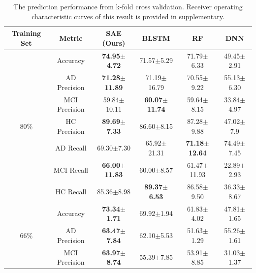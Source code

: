 \begin{table}[ht]
    \centering
    \caption{The prediction performance from k-fold cross validation. Receiver operating characteristic curves of this result is provided in supplementary.}\label{tab: experimetal results}
    \begin{tabular}{c c cccc}
        \toprule
    \multirow{1}{*}{\bfseries Training Set} & {\bfseries Metric} & \multicolumn{1}{c}{{\bfseries SAE} (Ours)} & \multicolumn{1}{c}{{\bfseries BLSTM}} & \multicolumn{1}{c}{{\bfseries RF}} & {\bfseries DNN}         \\
    \midrule
    \multirow{7}{*}{80\%} %
    & Accuracy & \multicolumn{1}{c}{{\bfseries 74.95$\pm$4.72}} & \multicolumn{1}{c}{71.57$\pm$5.29} & \multicolumn{1}{c}{71.79$\pm$6.33} & 49.45$\pm$2.91\\
    & AD Precision & \multicolumn{1}{c}{{\bfseries 71.28$\pm$11.89}} & \multicolumn{1}{c}{71.19$\pm$16.79} & \multicolumn{1}{c}{70.55$\pm$9.22} & 55.13$\pm$6.30\\
    & MCI Precision & \multicolumn{1}{c}{59.84$\pm$10.11} & \multicolumn{1}{c}{{\bfseries 60.07$\pm$11.74}} & \multicolumn{1}{c}{59.64$\pm$8.15} & 33.84$\pm$4.97\\
    & HC Precision & \multicolumn{1}{c}{{\bfseries 89.69$\pm$7.33}} & \multicolumn{1}{c}{86.60$\pm$8.15} & \multicolumn{1}{c}{87.28$\pm$9.88} & 47.02$\pm$7.9\\
    & AD Recall & \multicolumn{1}{c}{69.30$\pm$7.30} & \multicolumn{1}{c}{65.92$\pm$21.31} & \multicolumn{1}{c}{{\bfseries 71.18$\pm$12.64}} & 74.49$\pm$7.45\\
    & MCI Recall & \multicolumn{1}{c}{{\bfseries 66.00$\pm$11.83}} & \multicolumn{1}{c}{60.00$\pm$8.57} & \multicolumn{1}{c}{61.47$\pm$11.93} & 22.89$\pm$2.93\\
    & HC Recall & \multicolumn{1}{c}{85.36$\pm$8.98} & \multicolumn{1}{c}{{\bfseries 89.37$\pm$6.53}} & \multicolumn{1}{c}{86.58$\pm$9.50} & 36.33$\pm$8.67\\
    \midrule
    \multirow{7}{*}{66\%} %
    & Accuracy & \multicolumn{1}{c}{{\bfseries 73.34$\pm$1.71}} & \multicolumn{1}{c}{69.92$\pm$1.94} & \multicolumn{1}{c}{61.83$\pm$4.02} & 47.81$\pm$1.65\\
    & AD Precision & \multicolumn{1}{c}{{\bfseries 63.47$\pm$7.84}} & \multicolumn{1}{c}{62.10$\pm$5.53} & \multicolumn{1}{c}{51.63$\pm$1.29} & 55.26$\pm$1.61\\
    & MCI Precision & \multicolumn{1}{c}{{\bfseries 63.97$\pm$8.74}} & \multicolumn{1}{c}{55.39$\pm$7.85} & \multicolumn{1}{c}{53.91$\pm$8.85} & 31.03$\pm$1.37\\

\end{tabular}
\end{table}
